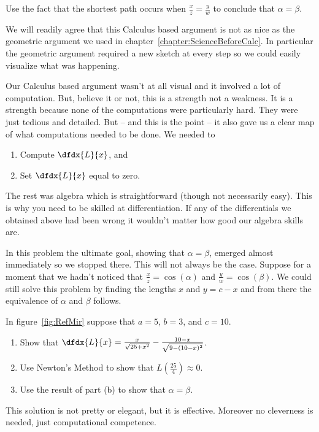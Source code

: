   \begin{ProficiencyDrill}
    Use the fact that the shortest path occurs when
    $\frac{x}{z}=\frac{y}{w}$ to conclude that $\alpha=\beta$.
  \end{ProficiencyDrill}


  We will readily agree that this Calculus based argument is not as
  nice as the geometric argument we used in
  chapter~\ref{chapter:ScienceBeforeCalc}. In particular the geometric
  argument required a new sketch at every step so we could easily
  visualize what was happening.

  Our Calculus based argument wasn't at all visual and it involved a
  lot of computation. But, believe it or not, this is a strength not a
  weakness.  It is a strength because none of the computations were
  particularly hard. They were just tedious and detailed. But -- and
  this is the point -- it also gave us a clear map of what
  computations needed to be done.  We needed to
  \begin{enumerate}
  \item Compute  $\dfdx{L}{x}$, and
  \item  Set $\dfdx{L}{x}$ equal to zero.
  \end{enumerate}
  The rest was
  algebra which is straightforward (though not necessarily easy). This
  is why you need to be skilled at differentiation. If any of the
  differentials we obtained above had been wrong it wouldn't matter
  how good our algebra skills are.

  In this problem the ultimate goal, showing that $\alpha=\beta$,
  emerged almost immediately so we stopped there. This will not always
  be the case.  Suppose for a moment that we hadn't noticed that
  $\frac{x}{z}=\cos(\alpha)$ and $\frac{y}{w}=\cos(\beta)$. We could
  still solve this problem by finding the lengths $x$ and $y=c-x$ and
  from there the equivalence of $\alpha$ and $\beta$ follows.

\begin{embeddedproblem}
  In figure~\ref{fig:RefMir} suppose that $a=5$, $b=3$, and $c=10$.
  \begin{enumerate}[label={\bf{}(\alph*)}]
  \item Show that
    $\dfdx{L}{x}=\frac{x}{\sqrt{25+x^2}}-\frac{10-x}{\sqrt{9-(10-x)^2}}$.
  \item Use Newton's Method to show that
    $L\left(\frac{25}{4}\right)\approx0$.
  \item Use the result of part (b) to show that $\alpha=\beta$.
  \end{enumerate}
  This solution is not pretty or elegant, but it is
  effective. Moreover no cleverness is needed, just computational
  competence. 
\end{embeddedproblem}


